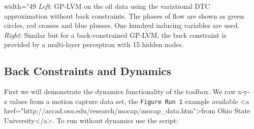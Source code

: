 \begin{center} width="49%
\emph{Left}: GP-LVM on the oil data using the variational DTC approximation without back constraints. The phases of flow are shown as green circles, red crosses and blue plusses.  One hundred inducing variables are used. \emph{Right}: Similar but for a back-constrained GP-LVM, the back constraint is provided by a multi-layer perceptron with 15 hidden nodes.\end{center}


\subsection{Back Constraints and Dynamics}

First we will demonstrate the dynamics functionality of the toolbox. We raw x-y-z values from a motion capture data set, the \texttt{Figure Run 1} example available <a href="http://accad.osu.edu/research/mocap/mocap_data.htm">from Ohio State University</a>. To run without dynamics use the script:
